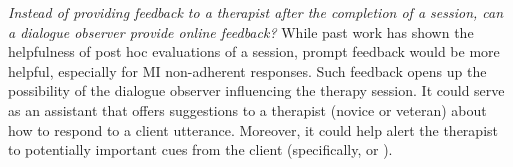 \emph{Instead of providing feedback to a therapist after the
  completion of a session, can a dialogue observer provide online
  feedback?} While past work has shown the helpfulness of post hoc
evaluations of a session, prompt feedback would be more helpful,
especially for MI non-adherent responses.  Such feedback opens up
the possibility of the dialogue observer influencing the therapy
session. It could serve as an assistant that offers suggestions to a
therapist (novice or veteran) about how to respond to a client
utterance. Moreover, it could help alert the therapist to
potentially important cues from the client (specifically, \CHANGE or
\SUSTAIN). %






